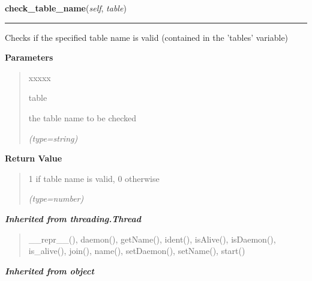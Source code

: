    \label{DBE:DBE:check_table_name}

    \vspace{0.5ex}

\hspace{.8\funcindent}\begin{boxedminipage}{\funcwidth}

    \raggedright \textbf{check\_table\_name}(\textit{self}, \textit{table})

    \vspace{-1.5ex}

    \rule{\textwidth}{0.5\fboxrule}
\setlength{\parskip}{2ex}
    Checks if the specified table name is valid (contained in the 'tables' 
    variable)

\setlength{\parskip}{1ex}
      \textbf{Parameters}
      \vspace{-1ex}

      \begin{quote}
        \begin{Ventry}{xxxxx}

          \item[table]

          the table name to be checked

            {\it (type=string)}

        \end{Ventry}

      \end{quote}

      \textbf{Return Value}
    \vspace{-1ex}

      \begin{quote}
      1 if table name is valid, 0 otherwise

      {\it (type=number)}

      \end{quote}

    \end{boxedminipage}


\large{\textbf{\textit{Inherited from threading.Thread}}}

\begin{quote}
\_\_repr\_\_(), daemon(), getName(), ident(), isAlive(), isDaemon(), is\_alive(), join(), name(), setDaemon(), setName(), start()
\end{quote}

\large{\textbf{\textit{Inherited from object}}}

